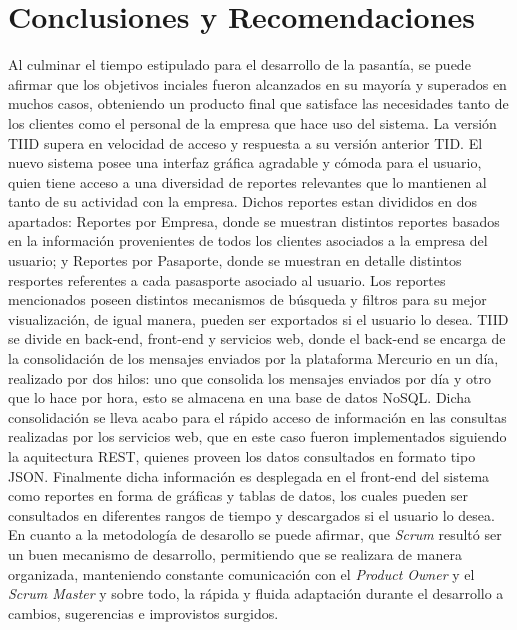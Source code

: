 \chapter{Conclusiones y Recomendaciones} \label{chapter:Conclusiones y Recomendaciones}

Al culminar el tiempo estipulado para el desarrollo de la pasantía, se puede afirmar que los objetivos inciales fueron alcanzados en su mayoría y superados en muchos casos, obteniendo un producto final que satisface las necesidades tanto de los clientes como el personal de la empresa que hace uso del sistema.
\newline
\newline
\indent La versión TIID supera en velocidad de acceso y respuesta a su versión anterior TID. El nuevo sistema posee una interfaz gráfica agradable y cómoda para el usuario, quien tiene acceso a una diversidad de reportes relevantes que lo mantienen al tanto de su actividad con la empresa. Dichos reportes estan divididos en dos apartados: Reportes por Empresa, donde se muestran distintos reportes basados en la información provenientes de todos los clientes asociados a la empresa del usuario; y Reportes por Pasaporte, donde se muestran en detalle distintos resportes referentes a cada pasasporte asociado al usuario. Los reportes mencionados poseen distintos mecanismos de búsqueda y filtros para su mejor visualización, de igual manera, pueden ser exportados si el usuario lo desea.
\newline
\newline
\indent TIID se divide en back-end, front-end y servicios web, donde el back-end se encarga de la consolidación de los mensajes enviados por la plataforma Mercurio en un día, realizado por dos hilos: uno que consolida los mensajes enviados por día y otro que lo hace por hora, esto se almacena en una base de datos NoSQL. Dicha consolidación se lleva acabo para el rápido acceso de información en las consultas realizadas por los servicios web, que en este caso fueron implementados siguiendo la aquitectura REST, quienes proveen los datos consultados en formato tipo JSON. Finalmente dicha información es desplegada en el front-end del sistema como reportes en forma de gráficas y tablas de datos, los cuales pueden ser consultados en diferentes rangos de tiempo y descargados si el usuario lo desea.
\newline
\newline
\indent En cuanto a la metodología de desarollo se puede afirmar, que \textit{Scrum} resultó ser un buen mecanismo de desarrollo, permitiendo que se realizara de manera organizada, manteniendo constante comunicación con el \textit{Product Owner} y el \textit{Scrum Master} y sobre todo, la rápida y fluida adaptación durante el desarrollo a cambios, sugerencias e improvistos surgidos.
